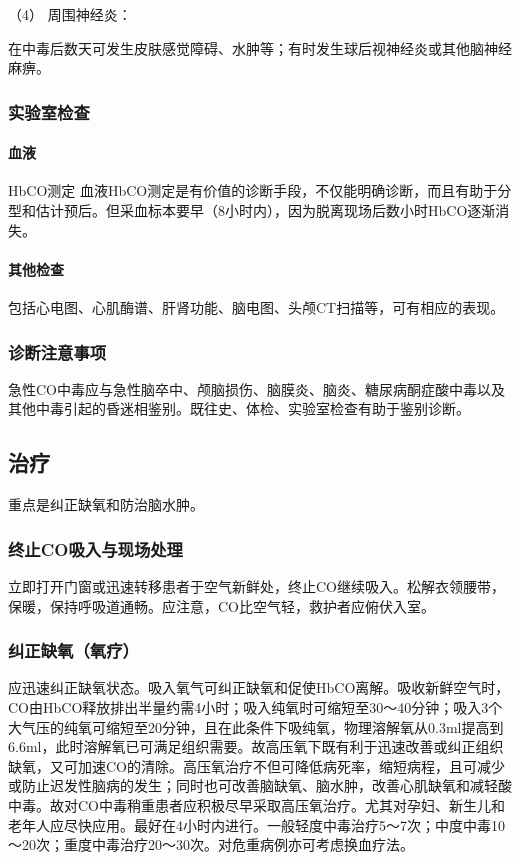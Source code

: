 \hypertarget{text00147.htmlux5cux23CHP5-4-1-2-2-3-4}{}
（4） 周围神经炎：

在中毒后数天可发生皮肤感觉障碍、水肿等；有时发生球后视神经炎或其他脑神经麻痹。

\subsubsection{实验室检查}

\paragraph{血液}

HbCO测定
血液HbCO测定是有价值的诊断手段，不仅能明确诊断，而且有助于分型和估计预后。但采血标本要早（8小时内），因为脱离现场后数小时HbCO逐渐消失。

\paragraph{其他检查}

包括心电图、心肌酶谱、肝肾功能、脑电图、头颅CT扫描等，可有相应的表现。

\subsubsection{诊断注意事项}

急性CO中毒应与急性脑卒中、颅脑损伤、脑膜炎、脑炎、糖尿病酮症酸中毒以及其他中毒引起的昏迷相鉴别。既往史、体检、实验室检查有助于鉴别诊断。

\subsection{治疗}

重点是纠正缺氧和防治脑水肿。

\subsubsection{终止CO吸入与现场处理}

立即打开门窗或迅速转移患者于空气新鲜处，终止CO继续吸入。松解衣领腰带，保暖，保持呼吸道通畅。应注意，CO比空气轻，救护者应俯伏入室。

\subsubsection{纠正缺氧（氧疗）}

应迅速纠正缺氧状态。吸入氧气可纠正缺氧和促使HbCO离解。吸收新鲜空气时，CO由HbCO释放排出半量约需4小时；吸入纯氧时可缩短至30～40分钟；吸入3个大气压的纯氧可缩短至20分钟，且在此条件下吸纯氧，物理溶解氧从0.3ml提高到6.6ml，此时溶解氧已可满足组织需要。故高压氧下既有利于迅速改善或纠正组织缺氧，又可加速CO的清除。高压氧治疗不但可降低病死率，缩短病程，且可减少或防止迟发性脑病的发生；同时也可改善脑缺氧、脑水肿，改善心肌缺氧和减轻酸中毒。故对CO中毒稍重患者应积极尽早采取高压氧治疗。尤其对孕妇、新生儿和老年人应尽快应用。最好在4小时内进行。一般轻度中毒治疗5～7次；中度中毒10～20次；重度中毒治疗20～30次。对危重病例亦可考虑换血疗法。

